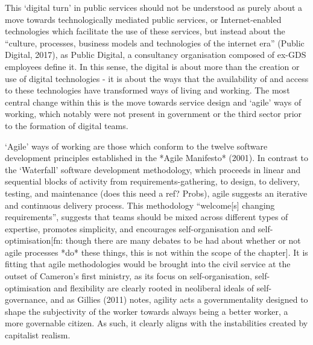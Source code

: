 This `digital turn' in public services should not be understood as
purely about a move towards technologically mediated public services, or
Internet-enabled technologies which facilitate the use of these
services, but instead about the ``culture, processes, business models
and technologies of the internet era'' (Public Digital, 2017), as Public
Digital, a consultancy organisation composed of ex-GDS employees define
it. In this sense, the digital is about more than the creation or use of
digital technologies - it is about the ways that the availability of and
access to these technologies have transformed ways of living and
working. The most central change within this is the move towards service
design and `agile' ways of working, which notably were not present in
government or the third sector prior to the formation of digital teams.

`Agile' ways of working are those which conform to the twelve software
development principles established in the *Agile Manifesto* (2001). In
contrast to the `Waterfall' software development methodology, which
proceeds in linear and sequential blocks of activity from
requirements-gathering, to design, to delivery, testing, and maintenance
(does this need a ref? Probs), agile suggests an iterative and
continuous delivery process. This methodology ``welcome{[}s{]} changing
requirements'', suggests that teams should be mixed across different
types of expertise, promotes simplicity, and encourages
self-organisation and self-optimisation{[}fn: though there are many
debates to be had about whether or not agile processes *do* these
things, this is not within the scope of the chapter{]}. It is fitting
that agile methodologies would be brought into the civil service at the
outset of Cameron's first ministry, as its focus on self-organisation,
self-optimisation and flexibility are clearly rooted in neoliberal
ideals of self-governance, and as Gillies (2011) notes, agility acts a
governmentality designed to shape the subjectivity of the worker towards
always being a better worker, a more governable citizen. As such, it
clearly aligns with the instabilities created by capitalist realism.

